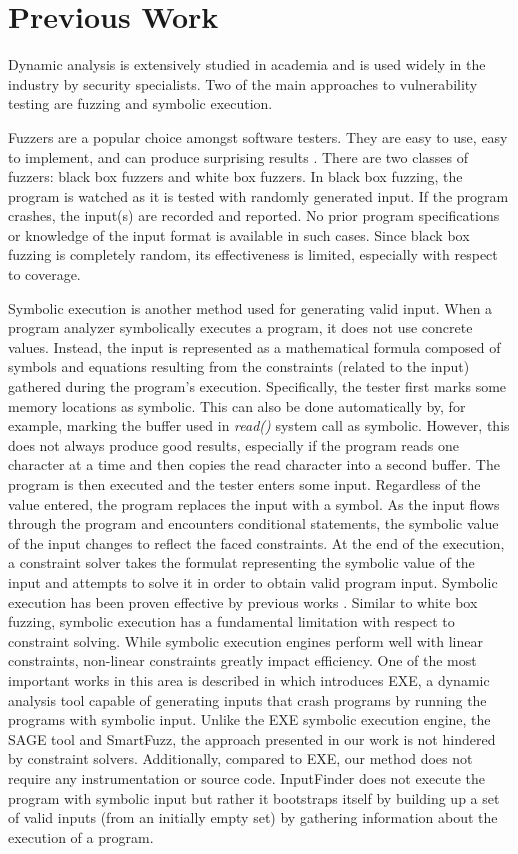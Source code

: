 \documentclass{acm_proc_article-sp}
\def \tool {InputFinder}
\begin{document}
\section{Previous Work} \label{prevwork}
Dynamic analysis is extensively studied in academia and is used widely in the industry by security specialists.
Two of the main approaches to vulnerability testing are fuzzing and symbolic execution.

Fuzzers are a popular choice amongst software testers.
They are easy to use, easy to implement, and can produce surprising results \cite{millerfuzz, millerfuzzrevisited}.
There are two classes of fuzzers: black box fuzzers and white box fuzzers.
In black box fuzzing, the program is watched as it is tested with randomly generated input.
If the program crashes, the input(s) are recorded and reported.
No prior program specifications or knowledge of the input format is available in such cases.
Since black box fuzzing is completely random, its effectiveness is limited, especially with respect to coverage.

Symbolic execution is another method used for generating valid input.
When a program analyzer symbolically executes a program, it does not use concrete values.
Instead, the input is represented as a mathematical formula composed of symbols and equations resulting from the constraints (related to the input) gathered during the program's execution.
Specifically, the tester first marks some memory locations as symbolic.
This can also be done automatically by, for example, marking the buffer used in \textit{read()} system call as symbolic.
However, this does not always produce good results, especially if the program reads one character at a time and then copies the read character into a second buffer.
The program is then executed and the tester enters some input.
Regardless of the value entered, the program replaces the input with a symbol.
As the input flows through the program and encounters conditional statements, the symbolic value of the input changes to reflect the faced constraints.
At the end of the execution, a constraint solver takes the formulat representing the symbolic value of the input and attempts to solve it in order to obtain valid program input.
Symbolic execution has been proven effective by previous works \cite{symbolicexecution, exesymex}.
Similar to white box fuzzing, symbolic execution has a fundamental limitation with respect to constraint solving.
While symbolic execution engines perform well with linear constraints, non-linear constraints greatly impact efficiency.
One of the most important works in this area is described in \cite{exesymex} which introduces EXE, a dynamic analysis tool capable of generating inputs that crash programs by running the programs with symbolic input.
Unlike the EXE symbolic execution engine, the SAGE tool and SmartFuzz, the approach presented in our work is not hindered by constraint solvers.
Additionally, compared to EXE, our method does not require any instrumentation or source code.
\tool{} does not execute the program with symbolic input but rather it bootstraps itself by building up a set of valid inputs (from an initially empty set) by gathering information about the execution of a program.
\end{document}
